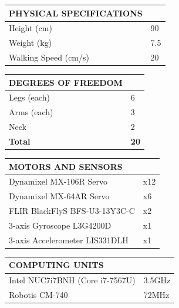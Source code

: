 \documentclass[10pt,a4paper]{article}
\begin{document}
\begin{multicols}{2}
\begin{table}[H]
	\begin{tabular}{|m{5.9cm}|m{1.25cm}|}
		\hline
		\rowcolor[rgb]{0.0, 0.0, 0.0}
		{\color{textcolour}\textbf{{PHYSICAL SPECIFICATIONS}}} & \\
		\hline
		Height (cm) & 90 \\
		\hline
		Weight (kg) & 7.5 \\
		\hline
		Walking Speed (cm/s) & 20 \\
		\hline
	\end{tabular}
\end{table}

\begin{table}[H]
	\begin{tabular}{|m{5.9cm}|m{1.25cm}|}
		\hline
		\rowcolor[rgb]{0.0, 0.0, 0.0}
		{\color{textcolour}\textbf{{DEGREES OF FREEDOM}}} & \\
		\hline
		Legs (each) & 6 \\
		\hline
		Arms (each) & 3 \\
		\hline
		Neck & 2 \\
		\hline
		\textbf{Total} & \textbf{20} \\
		\hline
	\end{tabular}
\end{table}

\begin{table}[H]
	\begin{tabular}{|m{5.9cm}|m{1.25cm}|}
		\hline
		\rowcolor[rgb]{0.0, 0.0, 0.0}
		{\color{textcolour}\textbf{{MOTORS AND SENSORS}}} & \\
		\hline
		Dynamixel MX-106R Servo & x12 \\
		\hline
		Dynamixel MX-64AR Servo & x6 \\
		\hline
		FLIR BlackFlyS BFS-U3-13Y3C-C & x2 \\
		\hline
		3-axis Gyroscope L3G4200D & x1 \\
		\hline  
		3-axis Accelerometer LIS331DLH & x1 \\
		\hline
	\end{tabular}
\end{table}

\begin{table}[H]
	\begin{tabular}{|m{5.9cm}|m{1.25cm}|}
		\hline
		\rowcolor[rgb]{0.0, 0.0, 0.0}
		{\color{textcolour}\textbf{{COMPUTING UNITS}}} & \\
		\hline
		Intel NUC7i7BNH (Core i7-7567U) & 3.5GHz \\
		\hline
		Robotis CM-740 & 72MHz \\
		\hline
	\end{tabular}
\end{table}


\end{multicols}
\end{document}
